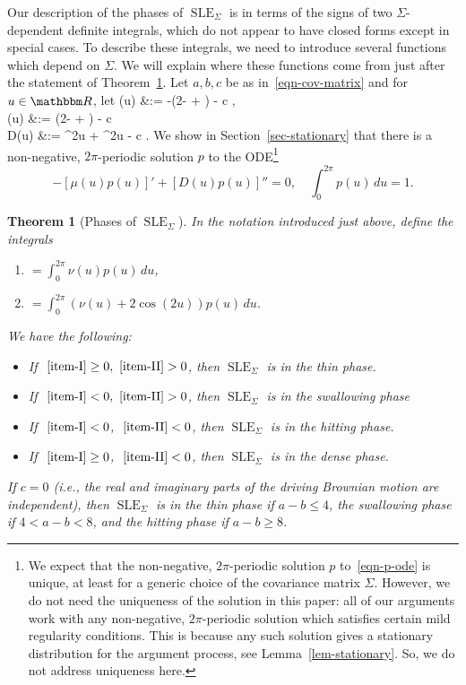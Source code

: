\documentclass[11pt]{article}
\theoremstyle{plain}
\newtheorem{thm}{Theorem}[section]
\theoremstyle{definition}
\numberwithin{equation}{section}
\def\allb#1\alle{\begin{align}#1\end{align}}
\newcommand{\eqb}{\begin{equation}}
\newcommand{\eqe}{\end{equation}}
\newcommand{\BB}{\mathbbm}
\newcommand{\SLEG}{{\operatorname{SLE}}_\Sigma}
\let\originalleft\left
\let\originalright\right
\renewcommand{\left}{\mathopen{}\mathclose\bgroup\originalleft}
\renewcommand{\right}{\aftergroup\egroup\originalright}
\begin{document}
Our description of the phases of $\SLEG$ is in terms of the signs of two $\Sigma$-dependent definite integrals, which do not appear to have closed forms except in special cases. To describe these integrals, we need to introduce several functions which depend on $\Sigma$. We will explain where these functions come from just after the statement of Theorem~\ref{thm-phases}. 
Let $a,b,c$ be as in~\eqref{eqn-cov-matrix} and for $u\in\BB R$, let 
\allb \label{eqn-nu-D}
\mu(u) &:=  -\left(2- + \right)  - c , \notag\\
\nu(u) &:= \left(2- + \right)  - c  \quad {} \quad \notag\\
D(u) &:=   \sin^2{u} +  \cos^2{u} - c  .
\alle
We show in Section~\ref{sec-stationary} that there is a non-negative, $2\pi$-periodic solution $p$ to the ODE\footnote{
We expect that the non-negative, $2\pi$-periodic solution $p$ to~\eqref{eqn-p-ode} is unique, at least for a generic choice of the covariance matrix $\Sigma$. However, we do not need the uniqueness of the solution in this paper: all of our arguments work with any non-negative, $2\pi$-periodic solution which satisfies certain mild regularity conditions. This is because any such solution gives a stationary distribution for the argument process, see Lemma~\ref{lem-stationary}. So, we do not address uniqueness here. 
}
\eqb \label{eqn-p-ode}
-[\mu(u) p(u)]' + [D(u) p(u)]'' = 0 ,\quad \int_0^{2\pi} p(u) \,du = 1. 
\eqe
 


\begin{thm}[Phases of $\SLEG$] 
In the notation introduced just above, define the integrals
\begin{enumerate}[label=\textup{(\textbf{\Roman*})}] 
\item  \label{item-I}  $= \int_0^{2\pi} \nu(u)p(u) \, du$,
 \item \label{item-II} $= \int_0^{2\pi} (\nu(u) + 2 \cos(2u))p(u)\, du$.
\end{enumerate} 
We have the following:
\begin{itemize}
    \item If $~\ref{item-I}\geq 0,~\ref{item-II}>0$, then $\SLEG$ is in the thin phase.
    \item If $~\ref{item-I}<0,~\ref{item-II}>0$, then $\SLEG$ is in the swallowing phase 
    \item If $~\ref{item-I}<0$, $~\ref{item-II} < 0$, then $\SLEG$ is in the hitting phase.  
    \item If $~\ref{item-I}\geq 0$, $~\ref{item-II} <  0$, then $\SLEG$ is in the dense phase. 
\end{itemize}
If $c=0$ (i.e., the real and imaginary parts of the driving Brownian motion are independent),  then $\SLEG$ is in the thin phase if $a-b\leq 4$, the swallowing phase if $4 < a-b<8$, and the hitting phase if $a-b\geq 8$. 
\label{thm-phases}
\end{thm}
\end{document}
